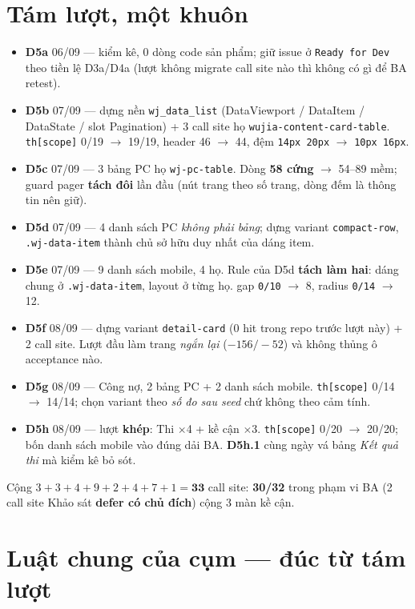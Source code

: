 \section{Tám lượt, một khuôn}

\begin{itemize}
\item \textbf{D5a} 06/09 --- kiểm kê, 0 dòng code sản phẩm; giữ issue ở \texttt{Ready for Dev} theo
  tiền lệ D3a/D4a (lượt không migrate call site nào thì không có gì để BA retest).
\item \textbf{D5b} 07/09 --- dựng nền \texttt{wj\_data\_list} (DataViewport / DataItem / DataState /
  slot Pagination) + 3 call site họ \texttt{wujia-content-card-table}. \texttt{th[scope]}
  0/19 $\to$ 19/19, header 46 $\to$ 44, đệm \texttt{14px 20px} $\to$ \texttt{10px 16px}.
\item \textbf{D5c} 07/09 --- 3 bảng PC họ \texttt{wj-pc-table}. Dòng \textbf{58 cứng} $\to$ 54--89
  mềm; guard pager \textbf{tách đôi} lần đầu (nút trang theo số trang, dòng đếm là thông tin nên giữ).
\item \textbf{D5d} 07/09 --- 4 danh sách PC \emph{không phải bảng}; dựng variant
  \texttt{compact-row}, \texttt{.wj-data-item} thành chủ sở hữu duy nhất của dáng item.
\item \textbf{D5e} 07/09 --- 9 danh sách mobile, 4 họ. Rule của D5d \textbf{tách làm hai}: dáng
  chung ở \texttt{.wj-data-item}, layout ở từng họ. gap \texttt{0/10} $\to$ 8, radius
  \texttt{0/14} $\to$ 12.
\item \textbf{D5f} 08/09 --- dựng variant \texttt{detail-card} (0 hit trong repo trước lượt này) +
  2 call site. Lượt đầu làm trang \emph{ngắn lại} ($-156/-52$) và không thủng ô acceptance nào.
\item \textbf{D5g} 08/09 --- Công nợ, 2 bảng PC + 2 danh sách mobile. \texttt{th[scope]}
  0/14 $\to$ 14/14; chọn variant theo \emph{số đo sau seed} chứ không theo cảm tính.
\item \textbf{D5h} 08/09 --- lượt \textbf{khép}: Thi $\times$4 + kề cận $\times$3.
  \texttt{th[scope]} 0/20 $\to$ 20/20; bốn danh sách mobile vào đúng dải BA.
  \textbf{D5h.1} cùng ngày vá bảng \emph{Kết quả thi} mà kiểm kê bỏ sót.
\end{itemize}

Cộng $3+3+4+9+2+4+7+1 = \mathbf{33}$ call site: \textbf{30/32} trong phạm vi BA (2 call site Khảo
sát \textbf{defer có chủ đích}) cộng 3 màn kề cận.

\section{Luật chung của cụm --- đúc từ tám lượt}

